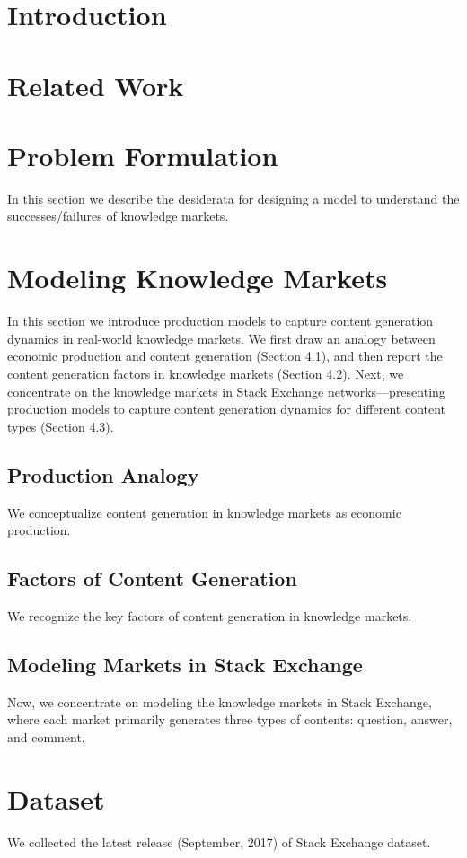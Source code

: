 \section{Introduction}

\section{Related Work}

\section{Problem Formulation} 
In this section we describe the desiderata for designing a model to understand the successes/failures of knowledge markets.

\section{Modeling Knowledge Markets}
In this section we introduce production models to capture content generation dynamics in real-world knowledge markets. We first draw an analogy between economic production and content generation (Section 4.1), and then report the content generation factors in knowledge markets (Section 4.2). Next, we concentrate on the knowledge markets in Stack Exchange networks---presenting production models to capture content generation dynamics for different content types (Section 4.3).
\subsection{Production Analogy} 
We conceptualize content generation in knowledge markets as economic production.
\subsection{Factors of Content Generation} 
We recognize the key factors of content generation in knowledge markets.
\subsection{Modeling Markets in Stack Exchange}
Now, we concentrate on modeling the knowledge markets in Stack Exchange, where each market primarily generates three types of contents: question, answer, and comment. 

\section{Dataset} 
We collected the latest release (September, 2017) of Stack Exchange dataset. 

